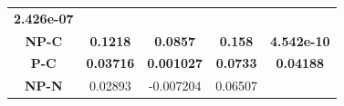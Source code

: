 \documentclass[]{article}
\begin{document}
\begin{longtable}[]{@{}ccccc@{}}
\begin{minipage}[t]{0.16\columnwidth}
\textbf{2.426e-07}\strut
\end{minipage}\tabularnewline
\begin{minipage}[t]{0.13\columnwidth}\centering\strut
\textbf{NP-C}\strut
\end{minipage} & \begin{minipage}[t]{0.16\columnwidth}\centering\strut
\textbf{0.1218}\strut
\end{minipage} & \begin{minipage}[t]{0.16\columnwidth}\centering\strut
\textbf{0.0857}\strut
\end{minipage} & \begin{minipage}[t]{0.16\columnwidth}\centering\strut
\textbf{0.158}\strut
\end{minipage} & \begin{minipage}[t]{0.16\columnwidth}\centering\strut
\textbf{4.542e-10}\strut
\end{minipage}\tabularnewline
\begin{minipage}[t]{0.13\columnwidth}\centering\strut
\textbf{P-C}\strut
\end{minipage} & \begin{minipage}[t]{0.16\columnwidth}\centering\strut
\textbf{0.03716}\strut
\end{minipage} & \begin{minipage}[t]{0.16\columnwidth}\centering\strut
\textbf{0.001027}\strut
\end{minipage} & \begin{minipage}[t]{0.16\columnwidth}\centering\strut
\textbf{0.0733}\strut
\end{minipage} & \begin{minipage}[t]{0.16\columnwidth}\centering\strut
\textbf{0.04188}\strut
\end{minipage}\tabularnewline
\begin{minipage}[t]{0.13\columnwidth}\centering\strut
\textbf{NP-N}\strut
\end{minipage} & \begin{minipage}[t]{0.16\columnwidth}\centering\strut
0.02893\strut
\end{minipage} & \begin{minipage}[t]{0.16\columnwidth}\centering\strut
-0.007204\strut
\end{minipage} & \begin{minipage}[t]{0.16\columnwidth}\centering\strut
0.06507\strut
\end{minipage} & \begin{minipage}[t]{0.16\columnwidth}\centering\strut

\end{minipage}
\end{longtable}
\end{document}
